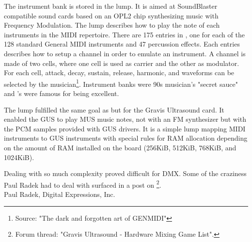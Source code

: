 \par
The instrument bank is stored in the  lump. It is aimed at SoundBlaster compatible sound cards based on an OPL2 chip synthesizing music with Frequency Modulation. The lump describes how to play the note of each instruments in the MIDI repertoire. There are 175 entries in , one for each of the 128 standard General MIDI instruments and 47 percussion effects. Each entries describes how to setup a channel in order to emulate an instrument. A channel is made of two cells, where one cell is used as carrier and the other as modulator. For each cell, attack, decay, sustain, release, harmonic, and waveforms can be selected by the musician\footnote{Source: "The dark and forgotten art of GENMIDI" }. Instrument banks were 90s musician's "secret sauce" and \doom's were famous for being excellent.\\
\par
The  lump fulfilled the same goal as  but for the Gravis Ultrasound card. It enabled the GUS to play MUS music notes, not with an FM synthesizer but with the PCM samples provided with GUS drivers. It is a simple lump mapping MIDI instruments to GUS instruments with special rules for RAM allocation depending on the amount of RAM installed on the board (256KiB, 512KiB, 768KiB, and 1024KiB).\pagebreak



Dealing with so much complexity proved difficult for DMX. Some of the craziness Paul Radek had to deal with surfaced in a post on \footnote{Forum thread: "Gravis Ultrasound - Hardware Mixing Game List".}.\\





{Paul Radek, Digital Expressions, Inc.}\\
\par

